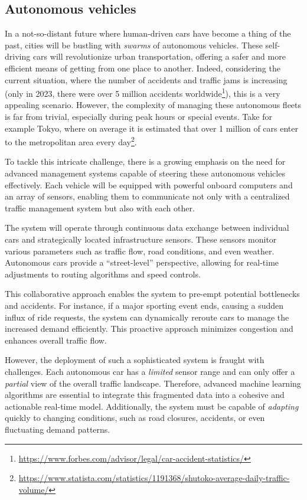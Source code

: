 \subsection{Autonomous vehicles}
In a not-so-distant future
 where human-driven cars have become a thing of the past, 
 cities will be bustling with \emph{swarms} of autonomous vehicles. 
% 
These self-driving cars will revolutionize urban transportation, 
 offering a safer and more efficient means of getting from one place to another. 
Indeed, considering the current situation, 
 where the number of accidents and traffic jams is increasing (only in 2023, there were over 5 million accidents worldwide\footnote{\url{https://www.forbes.com/advisor/legal/car-accident-statistics/}}), 
 this is a very appealing scenario.
However, the complexity of managing these autonomous fleets is far from trivial, 
 especially during peak hours or special events. 
%
Take for example Tokyo,
 where on average it is estimated that
 over 1 million of cars enter to the metropolitan area every day\footnote{\url{https://www.statista.com/statistics/1191368/shutoko-average-daily-traffic-volume/}}.

To tackle this intricate challenge, 
 there is a growing emphasis on the need for advanced management systems capable 
 of steering these autonomous vehicles effectively. 
 Each vehicle will be equipped with powerful onboard computers 
 and an array of sensors, 
 enabling them to communicate not only with a centralized traffic management system 
 but also with each other.

The system will operate through continuous data 
 exchange between individual cars 
 and strategically located infrastructure sensors. 
 These sensors monitor various parameters such as traffic flow, 
 road conditions, and even weather. 
 Autonomous cars provide a ``street-level'' perspective, 
 allowing for real-time adjustments to routing algorithms 
 and speed controls.

This collaborative approach enables the system to pre-empt potential bottlenecks and accidents. 
 For instance, if a major sporting event ends, 
 causing a sudden influx of ride requests, 
 the system can dynamically reroute cars to manage the increased demand efficiently. 
 This proactive approach minimizes congestion and enhances overall traffic flow.

However, the deployment of such a sophisticated system is fraught with challenges. 
 Each autonomous car has a \emph{limited} sensor range and can only offer a \emph{partial} view of the overall traffic landscape. 
 Therefore, advanced machine learning algorithms are essential to integrate this fragmented data into a cohesive and actionable real-time model. 
 Additionally, the system must be capable of \emph{adapting} quickly to changing conditions, such as road closures, accidents, or even fluctuating demand patterns.

